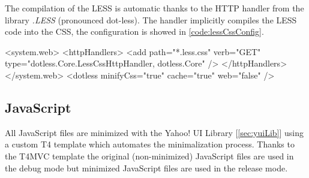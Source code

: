 The compilation of the LESS is automatic thanks to the HTTP handler from the library \emph{.LESS} (pronounced dot-less).
The handler implicitly compiles the LESS code into the CSS, the configuration is showed in \autoref{code:lessCssConfig}.


\begin{XML}[label=code:lessCssConfig,caption={Configuration of implicit LESS files compilation in \emph{Web.config}}]
<system.web>
	<httpHandlers>
		<add path="*.less.css" verb="GET"
			type="dotless.Core.LessCssHttpHandler, dotless.Core" />
	</httpHandlers>
</system.web>
<dotless minifyCss="true" cache="true" web="false" />
\end{XML}


\subsection{JavaScript}
\label{sec:implJs}

All JavaScript files are minimized with the Yahoo! UI Library [\ref{sec:yuiLib}] using a custom T4 template which automates the minimalization process.
Thanks to the T4MVC template the original (non-minimized) JavaScript files are used in the debug mode but minimized JavaScript files are used in the release mode.











